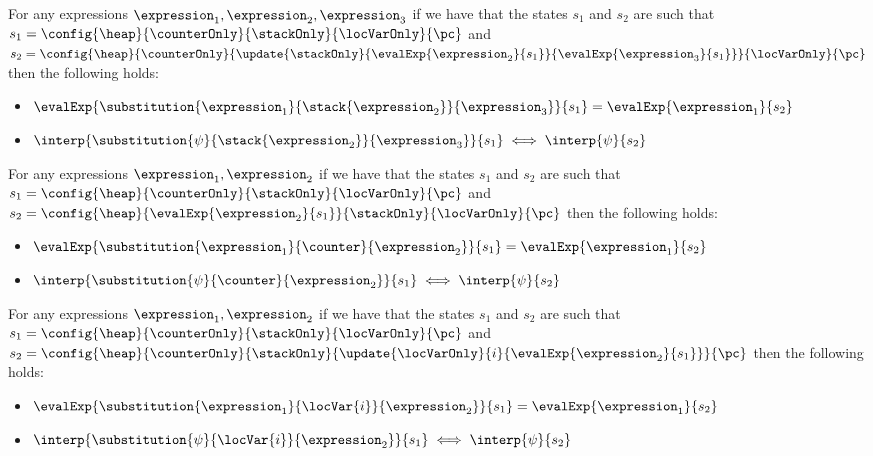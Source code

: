 \begin{substStack}\label{substStack} 
For any expressions $ \expression_1, \expression_2, \expression_3 $ 
if we have that the states $s_1$ and $s_2$ are such that
 $s_1 =   \config{\heap}{\counterOnly}{ \stackOnly }{\locVarOnly}{\pc }$ and 
  $s_2 = \config{\heap}{\counterOnly}{ \update{\stackOnly}
                                                                 {\evalExp{\expression_2}{ s_1 } }
                                                                 { \evalExp{\expression_3}{ s_1  } } }{\locVarOnly}{\pc }$ then
 the following holds:
\begin{itemize}
      \item  $     \evalExp{\substitution{\expression_1}{\stack{\expression_2}}{\expression_3}}{s_1 } = 
      \evalExp{\expression_1}{s_2 }$
      \item  $     \interp{\substitution{\psi}{\stack{\expression_2}}{\expression_3}}{s_1 } \iff
      \interp{\psi}{s_2 }$
\end{itemize}
\end{substStack}

\begin{substCntr}\label{substCntr}
For any expressions $ \expression_1, \expression_2 $ 
if we have that the states $s_1$ and $s_2$ are such that
 $s_1 =   \config{\heap}{\counterOnly}{ \stackOnly }{\locVarOnly}{\pc }$ and 
$s_2 =  \config{\heap}{\evalExp{ \expression_2}{ s_1  } }{ \stackOnly }{\locVarOnly}{\pc }  $ then 
the following holds:
\begin{itemize}
      \item $\evalExp{\substitution{\expression_1}{ \counter }{ \expression_2 }}{ s_1 } = \evalExp{\expression_1}{s_2} $
      \item $\interp{\substitution{\psi}{ \counter }{ \expression_2 }}{ s_1 } \iff \interp{\psi}{s_2} $
\end{itemize}
\end{substCntr} 

\begin{substLv}\label{substLv}
For any expressions $ \expression_1, \expression_2 $ 
if we have that the states $s_1$ and $s_2$ are such that
$ s_1 =   \config{\heap}{\counterOnly}{ \stackOnly }{\locVarOnly}{\pc }$ and 
$ s_2 =   \config{\heap}{\counterOnly }{ \stackOnly }{\update{\locVarOnly}{i}{ \evalExp{ \expression_2}{ s_1 } }}{\pc }  $ then 
the following holds:
\begin{itemize}
      \item $\evalExp{\substitution{\expression_1}{ \locVar{i} }{ \expression_2 }}{ s_1 } = \evalExp{\expression_1}{s_2} $
      \item $\interp{\substitution{\psi}{ \locVar{i} }{ \expression_2 }}{ s_1 } \iff \interp{\psi}{s_2} $
\end{itemize}
\end{substLv}


